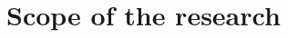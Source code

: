 





\ifpdf
    \graphicspath{{Content/figures/PNG/}{Content/figures/JPG/}{Content/figures/PDF/}{Content/figures/}}
\else
    \graphicspath{{Content/figures/EPS/}{Content/figures/}}
\fi

\chapter{Scope of the research}
\label{chap:introduction}
